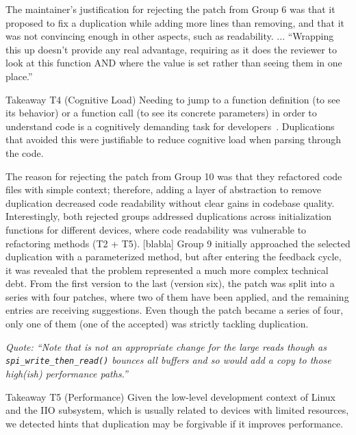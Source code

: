 \documentclass[10pt,conference]{IEEEtran}
\newenvironment{highlight-box}[1]{%
  \begin{tcolorbox}
  \textbf{#1:} \itshape}{\end{tcolorbox}}
\begin{document}
The maintainer's justification for rejecting the patch from Group 6 was that it proposed to fix a duplication while adding more lines than removing, and that it was not convincing enough in other aspects, such as readability. ... ``Wrapping this up doesn't provide any real advantage, requiring as
  it does the reviewer to look at this function AND where the value is set
  rather than seeing them in one place.''

\begin{highlight-box}{Takeaway T4 (Cognitive Load)}
  Needing to jump to a function definition (to see its behavior) or a function
  call (to see its concrete parameters) in order to understand code is a
  cognitively demanding task for developers~\cite{questions-programmers-ask}.
  Duplications that avoided this were justifiable to reduce cognitive load when
  parsing through the code.
\end{highlight-box}

The reason for rejecting the patch from Group 10 was that they refactored code files with simple context; therefore, adding a layer of abstraction to remove duplication decreased code readability without clear gains in codebase quality. Interestingly, both rejected groups addressed duplications across initialization functions for different devices, where code readability was vulnerable to refactoring methods (T2  + T5). [blabla] Group 9 initially approached the selected duplication with a parameterized method, but after entering the feedback cycle, it was revealed that the problem represented a much more complex technical debt. From the first version to the last (version six), the patch was split into a series with four patches, where two of them have been applied, and the remaining entries are receiving suggestions. Even though the patch became a series of four, only one of them (one of the accepted) was strictly tackling duplication.

\noindent
\begin{footnotesize}
\textit{
  Quote: ``Note that is not an appropriate change for the large reads though
  as \texttt{spi\_write\_then\_read()} bounces all buffers and so would add a
  copy to those high(ish) performance paths.''
}
\end{footnotesize}

\begin{highlight-box}{Takeaway T5 (Performance)}
  Given the low-level development context of Linux and the IIO subsystem, which
  is usually related to devices with limited resources, we detected hints that
  duplication may be forgivable if it improves performance.
\end{highlight-box}
\end{document}
